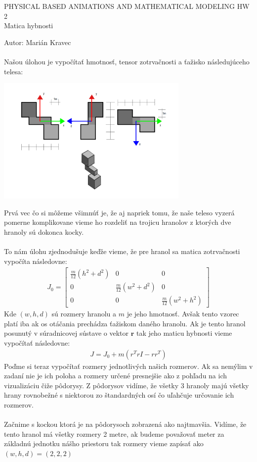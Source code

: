 \documentclass[a4paper]{article}
\begin{document}
 
	
	\pagestyle{plain}
	
	\begin{center}
		\sc\large
		PHYSICAL BASED ANIMATIONS AND MATHEMATICAL MODELING HW 2 
		\\
		Matica hybnosti
	\end{center}

	Autor: Marián Kravec
	\\
	\\
	Našou úlohou je vypočítať hmotnosť, tensor zotrvačnosti a ťažisko následujúceho telesa:
	
	\centerline{\includegraphics[width=0.7\textwidth]{podorysy}} 
	
	Prvá vec čo si môžeme všimnúť je, že aj napriek tomu, že naše teleso vyzerá pomerne komplikovane vieme ho rozdeliť na trojicu hranolov z ktorých dve hranoly sú dokonca kocky.
	\\
	\\
	To nám úlohu zjednodušuje keďže vieme, že pre hranol sa matica zotrvačnosti vypočíta následovne:
	\begin{align*}
		J_0 = \begin{bmatrix}
			\frac{m}{12}(h^2 + d^2) & 0 & 0 \\
			0 & \frac{m}{12}(w^2 + d^2) & 0 \\
			0 & 0 & \frac{m}{12}(w^2 + h^2)
		\end{bmatrix}
	\end{align*}
	Kde $(w, h, d)$ sú rozmery hranolu a $m$ je jeho hmotnosť. Avšak tento vzorec platí iba ak os otáčania prechádza ťažiskom daného hranolu. Ak je tento hranol posunutý v súradnicovej sústave o vektor $\boldsymbol{r}$ tak jeho maticu hybnosti vieme vypočítať následovne:
	\begin{align*}
		J = J_0 + m(r^TrI-rr^T)
	\end{align*}
	Poďme si teraz vypočítať rozmery jednotlivých našich rozmerov. Ak sa nemýlim v zadaní nie je ich poloha a rozmery určené presnejšie ako z pohľadu na ich vizualizáciu čiže pôdorysy. Z pôdorysov vidíme, že všetky 3 hranoly majú všetky hrany rovnobežné s niektorou zo štandardných osí čo uľahčuje určovanie ich rozmerov.
	\\
	\\
	Začnime s kockou ktorá je na pôdorysoch zobrazená ako najtmavšia. Vidíme, že tento hranol má všetky rozmery 2 metre, ak budeme považovať meter za základnú jednotku nášho priestoru tak rozmery vieme zapísať ako $(w, h, d) = (2, 2, 2)$
\end{document}
